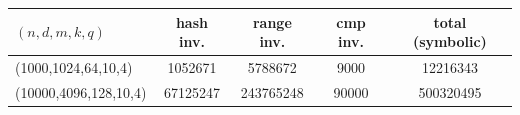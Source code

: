 \begin{tabular}{lcccc}
\toprule
$(n,d,m,k,q)$ & hash inv. & range inv. & cmp inv. & total (symbolic) \\
\midrule
(1000,1024,64,10,4) & 1052671 & 5788672 & 9000 & 12216343 \\
(10000,4096,128,10,4) & 67125247 & 243765248 & 90000 & 500320495 \\
\bottomrule
\end{tabular}
